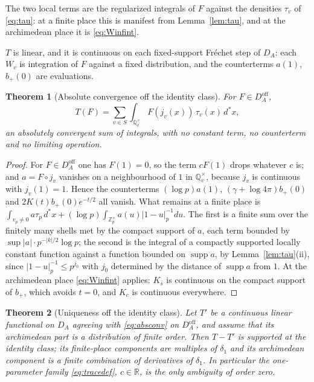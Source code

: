 \documentclass[11pt]{amsart}
\newtheorem{theorem}{Theorem}[section]
\theoremstyle{definition}
\theoremstyle{remark}
\newcommand{\R}{\mathbb R}
\newcommand{\Z}{\mathbb Z}
\newcommand{\Q}{\mathbb Q}
\newcommand{\dstar}{\,d^{*}}
\newcommand{\supp}{\operatorname{supp}}
\newcommand{\DA}{D_A}
\begin{document}
The two local terms are the regularized integrals of $F$ against the densities
$\tau_v$ of \eqref{eq:tau}: at a finite place this is manifest from
Lemma~\ref{lem:tau}, and at the archimedean place it is \eqref{eq:Winfint}.

$T$ is linear, and it is continuous on each fixed-support Fr\'echet step of
$\DA$: each $W_v$ is integration of $F$ against a fixed distribution, and the
counterterms $a(1)$, $b_{+}(0)$ are evaluations.

\begin{theorem}[Absolute convergence off the identity class]\label{thm:absconv}
For $F\in\DA^{\mathrm{off}}$,
\begin{equation}\label{eq:absconv}
T(F)=\sum_{v\in S}\int_{\Q_v^{\times}}F(j_v(x))\,\tau_v(x)\dstar x ,
\end{equation}
an absolutely convergent sum of integrals, with no constant term, no
counterterm and no limiting operation.
\end{theorem}

\begin{proof}
For $F\in\DA^{\mathrm{off}}$ one has $F(1)=0$, so the term $cF(1)$ drops
whatever $c$ is; and $a=F\circ j_v$ vanishes on a neighbourhood of $1$ in
$\Q_v^{\times}$, because $j_v$ is continuous with $j_v(1)=1$.  Hence the
counterterms $(\log p)a(1)$, $(\gamma+\log4\pi)b_{+}(0)$ and $2K(t)b_{+}(0)e^{-t/2}$ all
vanish.  What remains at a finite place is
$\int_{v_p\ne0}a\tau_p\dstar x+(\log p)\int_{\Z_p^{\times}}a(u)|1-u|_p^{-1}du$.
The first is a finite sum over the finitely many shells met by the compact
support of $a$, each term bounded by $\sup|a|\cdot p^{-|k|/2}\log p$; the
second is the integral of a compactly supported locally constant function
against a function bounded on $\supp a$, by Lemma~\ref{lem:tau}(ii), since
$|1-u|_p^{-1}\le p^{j_0}$ with $j_0$ determined by the distance of $\supp a$
from $1$.  At the archimedean place \eqref{eq:Winfint} applies: $K_{s}$ is continuous
on the compact support of $b_{+}$, which avoids $t=0$, and $K_{c}$ is
continuous everywhere.
\end{proof}

\begin{theorem}[Uniqueness off the identity class]\label{thm:unique}
Let $T'$ be a continuous linear functional on $\DA$ agreeing with
\eqref{eq:absconv} on $\DA^{\mathrm{off}}$, and assume that its archimedean
part is a distribution of finite order.  Then $T-T'$ is supported at the
identity class; its finite-place components are multiples of $\delta_1$ and its
archimedean component is a finite combination of derivatives of $\delta_1$.  In
particular the one-parameter family \eqref{eq:tracedef}, $c\in\R$, is the only
ambiguity of order zero.
\end{theorem}
\end{document}
